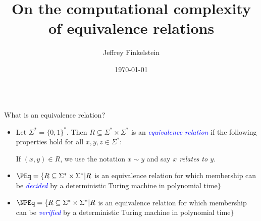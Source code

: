\documentclass[final]{beamer}
\title{On the computational complexity of equivalence relations}
\author{Jeffrey Finkelstein}
\institute{Tufts University}
\date{\today}
\newcommand{\emphblue}[1]{\emph{\textcolor{blue}{#1}}}
\newcommand{\sigmastar}{\Sigma^*}
\begin{document}
\begin{frame}{}
  \begin{columns}[t]

    \begin{column}{.3\linewidth}

      \begin{block}{\LARGE What is an equivalence relation?}
        \Large
        \begin{itemize}
        \item Let $\sigmastar=\{0,1\}^*$. Then
          $R\subseteq\sigmastar\times\sigmastar$ is an \emphblue{equivalence
          relation} if the following properties hold for all
          $x,y,z\in\sigmastar$:
          If $(x,y)\in R$, we use the notation $x\sim y$ and say \emph{$x$
            relates to $y$}.
        \item $\PEq=\{R\subseteq\sigmastar\times\sigmastar|R$ is an equivalence
          relation for which membership can be \emphblue{decided} by a
          deterministic Turing machine in polynomial time$\}$
        \item $\NPEq=\{R\subseteq\sigmastar\times\sigmastar|R$ is an
          equivalence relation for which membership can be \emphblue{verified}
          by a deterministic Turing machine in polynomial time$\}$
        \end{itemize}
      \end{block}


\end{column}
\end{columns}
\end{frame}
\end{document}

